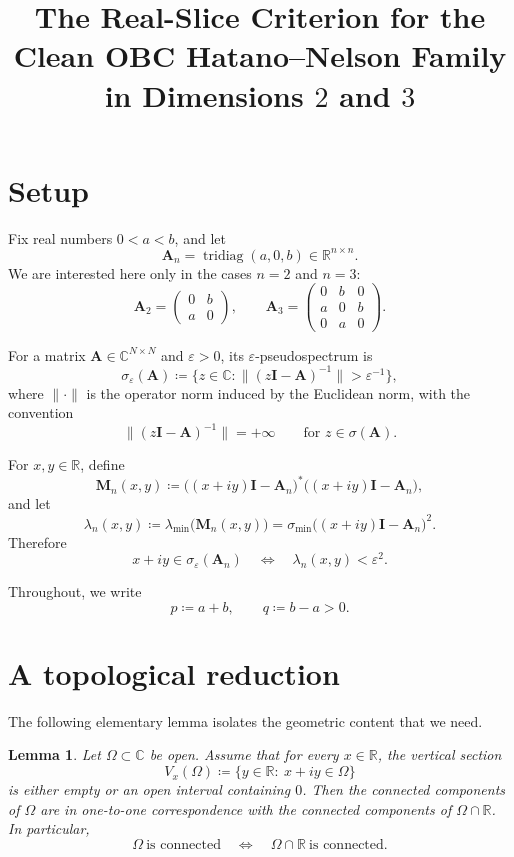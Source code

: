 \documentclass[11pt]{article}
\title{The Real-Slice Criterion for the Clean OBC Hatano--Nelson Family\\
in Dimensions \(2\) and \(3\)}
\author{}
\date{}
\newtheorem{lemma}[theorem]{Lemma}
\newcommand{\C}{\mathbb{C}}
\newcommand{\R}{\mathbb{R}}
\newcommand{\eps}{\varepsilon}
\begin{document}
\maketitle

\section{Setup}

Fix real numbers \(0<a<b\), and let
\[
\mathbf A_n=\operatorname{tridiag}(a,0,b)
\in \R^{n\times n}.
\]
We are interested here only in the cases \(n=2\) and \(n=3\):
\[
\mathbf A_2=\begin{pmatrix}0&b\\ a&0\end{pmatrix},
\qquad
\mathbf A_3=\begin{pmatrix}0&b&0\\ a&0&b\\ 0&a&0\end{pmatrix}.
\]

For a matrix \(\mathbf A\in\C^{N\times N}\) and \(\eps>0\), its \(\eps\)-pseudospectrum is
\[
\sigma_\eps(\mathbf A)
\coloneqq
\bigl\{z\in\C:\|(z\mathbf I-\mathbf A)^{-1}\|>\eps^{-1}\bigr\},
\]
where \(\|\cdot\|\) is the operator norm induced by the Euclidean norm, with the convention
\[
\|(z\mathbf I-\mathbf A)^{-1}\|=+\infty
\qquad\text{for } z\in\sigma(\mathbf A).
\]

For \(x,y\in\R\), define
\[
\mathbf M_n(x,y)
\coloneqq
\bigl((x+iy)\mathbf I-\mathbf A_n\bigr)^*
\bigl((x+iy)\mathbf I-\mathbf A_n\bigr),
\]
and let
\[
\lambda_n(x,y)\coloneqq \lambda_{\min}\!\bigl(\mathbf M_n(x,y)\bigr)
=
\sigma_{\min}\!\bigl((x+iy)\mathbf I-\mathbf A_n\bigr)^2.
\]
Therefore
\[
x+iy\in \sigma_\eps(\mathbf A_n)
\quad\Longleftrightarrow\quad
\lambda_n(x,y)<\eps^2.
\]

Throughout, we write
\[
p\coloneqq a+b,
\qquad
q\coloneqq b-a>0.
\]

\section{A topological reduction}

The following elementary lemma isolates the geometric content that we need.

\begin{lemma}\label{lem:topological}
Let \(\Omega\subset\C\) be open. Assume that for every \(x\in\R\), the vertical section
\[
V_x(\Omega)\coloneqq \{y\in\R:\ x+iy\in\Omega\}
\]
is either empty or an open interval containing \(0\). Then the connected components of
\(\Omega\) are in one-to-one correspondence with the connected components of
\(\Omega\cap\R\). In particular,
\[
\Omega\ \text{is connected}
\quad\Longleftrightarrow\quad
\Omega\cap\R\ \text{is connected}.
\]
\end{lemma}
\end{document}
